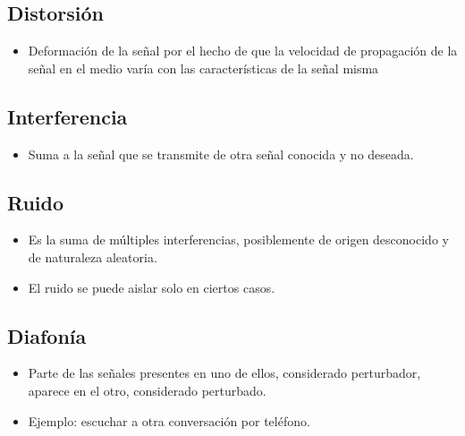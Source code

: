 \documentclass[11pt]{article}
\begin{document}
\subsection{Distorsión}
\label{sec:org9bb14b8}
\begin{itemize}
\item Deformación de la señal por el hecho de que la velocidad de propagación de la señal en el medio varía con las características de la señal misma
\end{itemize}
\subsection{Interferencia}
\label{sec:org8b1976d}
\begin{itemize}
\item Suma a la señal que se transmite de otra señal conocida y no deseada.
\end{itemize}
\subsection{Ruido}
\label{sec:org7cdf7c7}
\begin{itemize}
\item Es la suma de múltiples interferencias, posiblemente de origen desconocido y de naturaleza aleatoria.
\item El ruido se puede aislar solo en ciertos casos.
\end{itemize}
\subsection{Diafonía}
\label{sec:org2968281}
\begin{itemize}
\item Parte de las señales presentes en uno de ellos, considerado perturbador, aparece en el otro, considerado perturbado.
\item Ejemplo: escuchar a otra conversación por teléfono.
\end{itemize}
\end{document}
